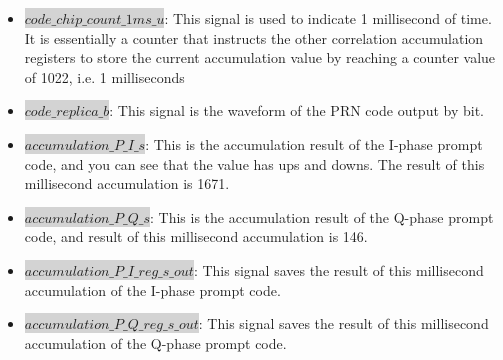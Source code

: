 \begin{itemize}
    \item \colorbox{lightgray}{$code\_chip\_count\_1ms\_u$}: This signal is used to indicate 1 millisecond of time. It is essentially a counter that instructs the other correlation accumulation registers to store the current accumulation value by reaching a counter value of 1022, i.e. 1 milliseconds
    \item \colorbox{lightgray}{$code\_replica\_b$}:  This signal is the waveform of the PRN  code output by bit.
    \item \colorbox{lightgray}{$accumulation\_P\_I\_s$}: This is the accumulation result of the I-phase prompt code, and you can see that the value has ups and downs. The result of this millisecond accumulation is \num{1671}.
    \item \colorbox{lightgray}{$accumulation\_P\_Q\_s$}: This is the accumulation result of the Q-phase prompt code, and result of this millisecond accumulation is \num{146}.
    \item \colorbox{lightgray}{$accumulation\_P\_I\_reg\_s\_out$}: This signal saves the result of this millisecond accumulation of the I-phase prompt code.
    \item \colorbox{lightgray}{$accumulation\_P\_Q\_reg\_s\_out$}: This signal saves the result of this millisecond accumulation of the Q-phase prompt code.
\end{itemize}
